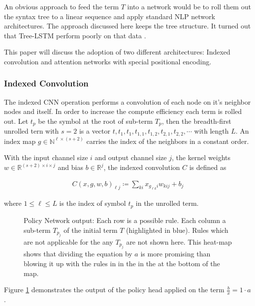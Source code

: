 \documentclass{scrartcl}
\theoremstyle{definition}
\begin{document}
An obvious approach to feed the term $T$ into a network would be to roll them out the syntax tree to a linear sequence and apply standard NLP network architectures. \cite{Lample2020Deep}
The approach discussed here keeps the tree structure. It turned out that Tree-LSTM perform poorly on that data \cite{tai2015improved}.

This paper will discuss the adoption of two different architectures: Indexed convolution and attention networks with special positional encoding.

\subsubsection{Indexed Convolution}

The indexed CNN operation performs a convolution of each node on it's neighbor nodes and itself.
In order to increase the compute efficiency each term is rolled out.
Let $t_p$ be the symbol at the root of sub-term $T_p$,
then the breadth-first unrolled tern with $s=2$ is a vector $t, t_1, t_1, t_{1,1},t_{1,2}, t_{2,1}, t_{2,2}, \cdots$ with length $L$.
An index map $g \in \mathbb{N}^{\ell\times \left( s+2 \right)}$ carries the index of the neighbors in a constant order.

With the input channel size $i$ and output channel size $j$, the kernel weights $w \in \mathbb{R}^{\left( s+2 \right)\times i \times j}$ and bias $b \in \mathbb{R}^j$,
the indexed convolution $C$ is defined as

\begin{align}
	C\left( x, g, w, b \right)_{\ell j} \coloneqq \sum_{ki}x_{g_{\ell k}i} w_{kij}+b_j
\end{align}

where $1 \leq \ell \leq L$ is the index of symbol $t_p$ in the unrolled term.


\begin{figure}[!htbp]
	\centering
	
	\caption{Policy Network output: Each row is a possible rule. Each column a sub-term $T_{p_j}$ of the initial term $T$ (highlighted in blue).
	Rules which are not applicable for the any $T_{p_j}$ are not shown here.
	This heat-map shows that dividing the equation by $a$ is more promising than blowing it up with the rules in in the in the at the bottom of the map.}
	\label{fig:network_output}
\end{figure}

Figure \ref{fig:network_output} demonstrates the output of the policy head applied on the term $\frac{b}{x}=1\cdot a$ .
\end{document}
